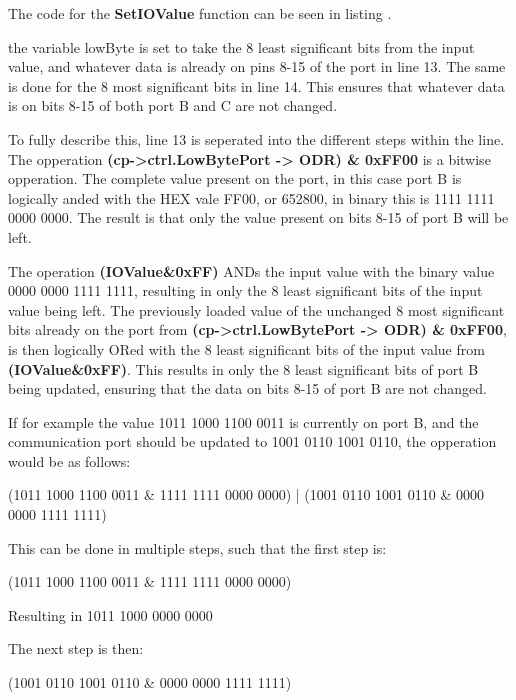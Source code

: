 The code for the \textbf{SetIOValue} function can be seen in listing .



the variable lowByte is set to take the 8 least significant bits from the input value, and whatever data is already on pins 8-15 of the port in line 13. The same is done for the 8 most significant bits in line 14. This ensures that whatever data is on bits 8-15 of both port B and C are not changed.

To fully describe this, line 13 is seperated into the different steps within the line. The opperation \textbf{(cp->ctrl.LowBytePort -> ODR) \& 0xFF00} is a bitwise opperation. The complete value present on the port, in this case port B is logically anded with the HEX vale FF00, or 652800, in binary this is 1111 1111 0000 0000. The result is that only the value present on bits 8-15 of port B will be left. 

The operation \textbf{(IOValue\&0xFF)} ANDs the input value with the binary value 0000 0000 1111 1111, resulting in only the 8 least significant bits of the input value being left. The previously loaded value of the unchanged 8 most significant bits already on the port from \textbf{(cp->ctrl.LowBytePort -> ODR) \& 0xFF00}, is then logically ORed with the 8 least significant bits of the input value from \textbf{(IOValue\&0xFF)}. This results in only the 8 least significant bits of port B being updated, ensuring that the data on bits 8-15 of port B are not changed.

If for example the value 1011 1000 1100 0011 is currently on port B, and the communication port should be updated to 1001 0110 1001 0110, the opperation would be as follows:

(1011 1000 1100 0011 \& 1111 1111 0000 0000) | (1001 0110 1001 0110 \& 0000 0000 1111 1111)

This can be done in multiple steps, such that the first step is:

(1011 1000 1100 0011 \& 1111 1111 0000 0000)

Resulting in 1011 1000 0000 0000 

The next step is then: 

(1001 0110 1001 0110 \& 0000 0000 1111 1111) 

